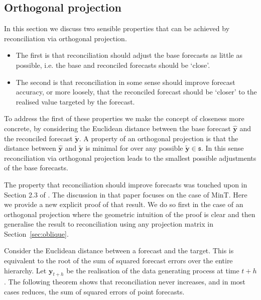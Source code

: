 \documentclass[12pt]{article}
\theoremstyle{definition}
\theoremstyle{property}
\begin{document}
	\subsection{Orthogonal projection}
	
	In this section we discuss two sensible properties that can be achieved by reconciliation via orthogonal projection.
\begin{itemize}
  \item The  first is that reconciliation should adjust the base forecasts as little as possible, i.e. the base and reconciled forecasts should be `close'.
  \item The second is that reconciliation in some sense should improve forecast accuracy, or more loosely, that the reconciled forecast should be `closer' to the realised value targeted by the forecast.
\end{itemize}

	
	To address the first of these properties we make the concept of closeness more concrete, by considering the Euclidean distance between the base forecast $\hat{\bm{y}}$ and the reconciled forecast  $\tilde{\bm{y}}$.  A property of an orthogonal projection is that the distance between $\hat{\bm{y}}$ and $\tilde{\bm{y}}$ is minimal for over any possible $\tilde{\bm{y}}\in\mathfrak{s}$.  In this sense reconciliation via orthogonal projection leads to the smallest possible adjustments of the base forecasts.
	
	The property that reconciliation should improve forecasts was touched upon in Section 2.3 of \cite{WicEtAl2019}.  The discussion in that paper focuses on the case of MinT. Here we provide a new explicit proof of that result.  We do so first in the case of an orthogonal projection where the geometric intuition of the proof is clear and then generalise the result to reconciliation using any projection matrix in Section~\ref{sec:oblique}.
		
	Consider the Euclidean distance between a forecast and the target. This is equivalent to the root of the sum of squared forecast errors over the entire hierarchy. Let $\bm{y}_{t+h}$ be the realisation of the data generating process at time $t+h$. The following theorem shows that reconciliation never increases, and in most cases reduces, the sum of squared errors of point forecasts.
	
\end{document}
